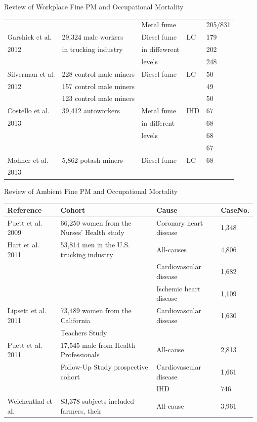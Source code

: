 \documentclass[final,t]{beamer}
\begin{document}
\begin{frame}[fragile]
\begin{columns}[t]
\begin{column}{0.26\linewidth}
\begin{block}{Review of Workplace Fine PM and Occupational Mortality}
\begin{tabular}{lllll}
   &  & Metal fume &  & 205/831 \\ 
  Garshick et al. & 29,324 male workers & Diesel fume & LC & 179 \\ 
  2012 & in trucking industry & in diffewrent &  & 202 \\ 
   &  & levels &  & 248 \\ 
  Silverman et al. & 228 control male miners & Diesel fume & LC & 50 \\ 
  2012 & 157 control male miners &  &  & 49 \\ 
   & 123 control male miners &  &  & 50 \\ 
  Costello et al. & 39,412 autoworkers & Metal fume & IHD & 67 \\ 
  2013 &  & in different &  & 68 \\ 
   &  & levels &  & 68 \\ 
   &  &  &  & 67 \\ 
  Mohner et al. & 5,862 potash miners & Diesel fume & LC & 68 \\ 
  2013 &  &  &  &  \\ 
   \hline
\end{tabular}\end{block}
\begin{block}{Review of Ambient Fine PM and Occupational Mortality}
\begin{tabular}{llll}
  \hline
Reference & Cohort & Cause & CaseNo. \\ 
  \hline
Puett et al. 2009 & 66,250 women from the Nurses' Health study & Coronary heart disease & 1,348 \\ 
  Hart et al. 2011 & 53,814 men in the U.S. trucking industry & All-causes & 4,806 \\ 
   &  & Cardiovascular disease & 1,682 \\ 
   &  & Ischemic heart disease & 1,109 \\ 
  Lipsett et al. 2011 & 73,489 women from the California & Cardiovascular disease & 1,630 \\ 
   & Teachers Study &  &  \\ 
  Puett et al. 2011 & 17,545 male from Health Professionals  & All-cause & 2,813 \\ 
   & Follow-Up Study prospective cohort & Cardiovascular disease & 1,661 \\ 
   &  & IHD & 746 \\ 
  Weichenthal et al. & 83,378 subjects included farmers, their  & All-cause & 3,961 \\ 

\end{tabular}
\end{block}
\end{column}
\end{columns}
\end{frame}
\end{document}
